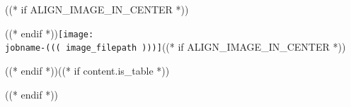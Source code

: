 ((* if ALIGN_IMAGE_IN_CENTER *))\begin{center}((* endif *))\texttt{[image: \\jobname-((( image\_filepath )))]}((* if ALIGN_IMAGE_IN_CENTER *))\end{center}((* endif *))((* if content.is_table *))\par\vspace{-5pt}((* endif *))
